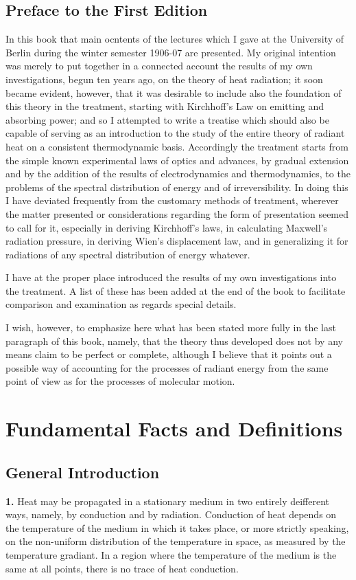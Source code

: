 \documentclass[12pt,oneside]{book}
\begin{document}
\chapter{Preface to the First Edition}
In this book that main ocntents of the lectures which I gave at the University of Berlin during the winter semester 1906-07 are presented. My original intention was merely to put together in a connected account the results of my own investigations, begun ten years ago, on the theory of heat radiation; it soon became evident, however, that it was desirable to include also the foundation of this theory in the treatment, starting with Kirchhoff's Law on emitting and absorbing power; and so I attempted to write a treatise which should also be capable of serving as an introduction to the study of the entire theory of radiant heat on a consistent thermodynamic basis. Accordingly the treatment starts from the simple known experimental laws of optics and advances, by gradual extension and by the addition of the results of electrodynamics and thermodynamics, to the problems of the spectral distribution of energy and of irreversibility. In doing this I have deviated frequently from the customary methods of treatment, wherever the matter presented or considerations regarding the form of presentation seemed to call for it, especially in deriving Kirchhoff's laws, in calculating Maxwell's radiation pressure, in deriving Wien's displacement law, and in generalizing it for radiations of any spectral distribution of energy whatever. \par

I have at the proper place introduced the results of my own investigations into the treatment. A list of these has been added at the end of the book to facilitate comparison and examination as regards special details. \par

I wish, however, to emphasize here what has been stated more fully in the last paragraph of this book, namely, that the theory thus developed does not by any means claim to be perfect or complete, although I believe that it points out a possible way of accounting for the processes of radiant energy from the same point of view as for the processes of molecular motion. \par
\tableofcontents
\mainmatter
\part{Fundamental Facts and Definitions}
\chapter{General Introduction}
\textbf{1.} Heat may be propagated in a stationary medium in two entirely deifferent ways, namely, by conduction and by radiation. Conduction of heat depends on the temperature of the medium in which it takes place, or more strictly speaking, on the non-uniform distribution of the temperature in space, as measured by the temperature gradiant. In a region where the temperature of the medium is the same at all points, there is no trace of heat conduction. \par
\end{document}
